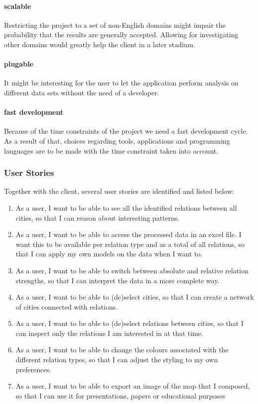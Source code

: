 \paragraph{scalable} Restricting the project to a set of non-English domains might impair the probability that the results are generally accepted. Allowing for investigating other domains would greatly help the client in a later stadium.
\paragraph{plugable} It might be interesting for the user to let the application perform analysis on different data sets without the need of a developer. 
\paragraph{fast development} Because of the time constraints of the project we need a fast development cycle. As a result of that, choices regarding tools, applications and programming languages are to be made with the time constraint taken into account.

\subsubsection{User Stories}
Together with the client, several user stories are identified and listed below:
\begin{enumerate}
    \item As a user, I want to be able to see all the identified relations between all cities, so that I can reason about interesting patterns.
    \item As a user, I want to be able to access the processed data in an excel file. I want this to be available per relation type and as a total of all relations, so that I can apply my own models on the data when I want to.
    \item As a user, I want to be able to switch between absolute and relative relation strengths, so that I can interpret the data in a more complete way.
    \item As a user, I want to be able to (de)select cities, so that I can create a network of cities connected with relations.
    \item As a user, I want to be able to (de)select relations between cities, so that I can inspect only the relations I am interested in at that time.
    \item As a user, I want to be able to change the colours associated with the different relation types, so that I can adjust the styling to my own preferences.
    \item As a user, I want to be able to export an image of the map that I composed, so that I can use it for presentations, papers or educational purposes
\end{enumerate}


